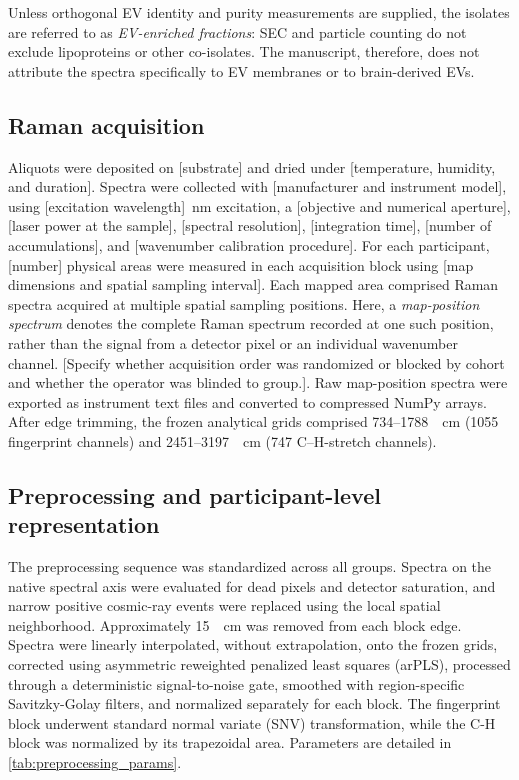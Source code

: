 \documentclass[preprint,12pt]{elsarticle}
\begin{document}
Unless orthogonal EV identity and purity measurements are supplied, the isolates are referred to as \emph{EV-enriched fractions}: SEC and particle counting do not exclude lipoproteins or other co-isolates. The manuscript, therefore, does not attribute the spectra specifically to EV membranes or to brain-derived EVs.

\subsection{Raman acquisition} 
\label{subsec:acquisition}

Aliquots were deposited on {\color{red}[substrate]} and dried under {\color{red}[temperature, humidity, and duration]}. Spectra were collected with {\color{red}[manufacturer and instrument model]}, using {\color{red}[excitation wavelength]}~nm excitation, a {\color{red}[objective and numerical aperture]}, {\color{red}[laser power at the sample]}, {\color{red}[spectral resolution]}, {\color{red}[integration time]}, {\color{red}[number of accumulations]}, and {\color{red}[wavenumber calibration procedure]}. For each participant, {\color{red}[number]} physical areas were measured in each acquisition block using {\color{red}[map dimensions and spatial sampling interval]}. Each mapped area comprised Raman spectra acquired at multiple spatial sampling positions. Here, a \emph{map-position spectrum} denotes the complete Raman spectrum recorded at one such position, rather than the signal from a detector pixel or an individual wavenumber channel. {\color{red}[Specify whether acquisition order was randomized or blocked by cohort and whether the operator was blinded to group.]}. Raw map-position spectra were exported as instrument text files and converted to compressed NumPy arrays. After edge trimming, the frozen analytical grids comprised 734--1788~\si{\per\centi\metre} (1055 fingerprint channels) and 2451--3197~\si{\per\centi\metre} (747 C--H-stretch channels).

\subsection{Preprocessing and participant-level representation} \label{subsec:preprocessing}

The preprocessing sequence was standardized across all groups. Spectra on the native spectral axis were evaluated for dead pixels and detector saturation, and narrow positive cosmic-ray events were replaced using the local spatial neighborhood. Approximately 15~\si{\per\centi\metre} was removed from each block edge. Spectra were linearly interpolated, without extrapolation, onto the frozen grids, corrected using asymmetric reweighted penalized least squares (arPLS), processed through a deterministic signal-to-noise gate, smoothed with region-specific Savitzky-Golay filters, and normalized separately for each block. The fingerprint block underwent standard normal variate (SNV) transformation, while the C-H block was normalized by its trapezoidal area. Parameters are detailed in \cref{tab:preprocessing_params}.
\end{document}
